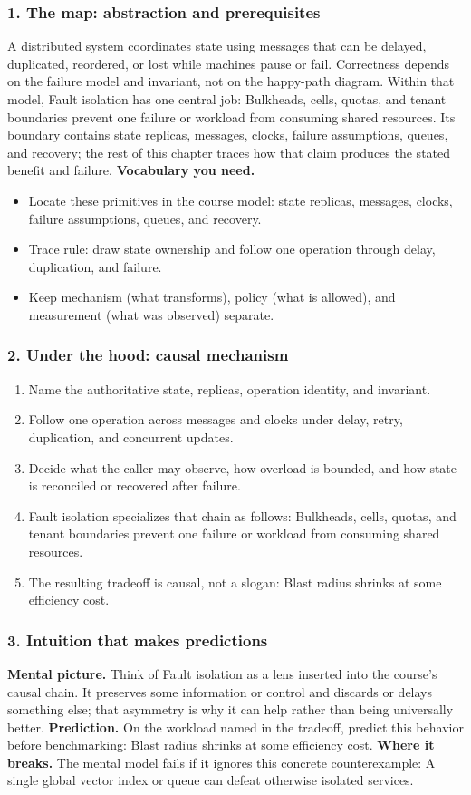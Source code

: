 \subsubsection*{1. The map: abstraction and prerequisites}
A distributed system coordinates state using messages that can be delayed, duplicated, reordered, or lost while machines pause or fail. Correctness depends on the failure model and invariant, not on the happy-path diagram.
Within that model, Fault isolation has one central job: Bulkheads, cells, quotas, and tenant boundaries prevent one failure or workload from consuming shared resources. Its boundary contains state replicas, messages, clocks, failure assumptions, queues, and recovery; the rest of this chapter traces how that claim produces the stated benefit and failure.
\textbf{Vocabulary you need.}\begin{itemize}
\item Locate these primitives in the course model: state replicas, messages, clocks, failure assumptions, queues, and recovery.
\item Trace rule: draw state ownership and follow one operation through delay, duplication, and failure.
\item Keep mechanism (what transforms), policy (what is allowed), and measurement (what was observed) separate.
\end{itemize}
\subsubsection*{2. Under the hood: causal mechanism}\begin{enumerate}
\item Name the authoritative state, replicas, operation identity, and invariant.
\item Follow one operation across messages and clocks under delay, retry, duplication, and concurrent updates.
\item Decide what the caller may observe, how overload is bounded, and how state is reconciled or recovered after failure.
\item Fault isolation specializes that chain as follows: Bulkheads, cells, quotas, and tenant boundaries prevent one failure or workload from consuming shared resources.
\item The resulting tradeoff is causal, not a slogan: Blast radius shrinks at some efficiency cost.
\end{enumerate}
\subsubsection*{3. Intuition that makes predictions}
\textbf{Mental picture.} Think of Fault isolation as a lens inserted into the course's causal chain. It preserves some information or control and discards or delays something else; that asymmetry is why it can help rather than being universally better.
\textbf{Prediction.} On the workload named in the tradeoff, predict this behavior before benchmarking: Blast radius shrinks at some efficiency cost.
\textbf{Where it breaks.} The mental model fails if it ignores this concrete counterexample: A single global vector index or queue can defeat otherwise isolated services.
